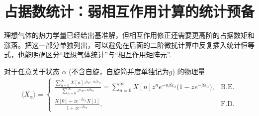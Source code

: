 \section{占据数统计：弱相互作用计算的统计预备}

理想气体的热力学量已经给出基准解，但相互作用修正还需要更高阶的占据数矩和涨落。把这一部分单独列出，可以避免在后面的二阶微扰计算中反复插入统计恒等式，也能明确区分“理想气体统计”与“相互作用矩阵元”.

对于任意关于状态 \(\alpha\) (不含自旋，自旋简并度单独记为\(g\)) 的物理量
\begin{align*}
	\langle X_{\alpha} \rangle =
	\begin{cases}
		\displaystyle \frac{ \sum_{n=0}^{\infty} X[n] z^{n} e^{-n \beta \varepsilon_{\alpha}}}{ \sum_{n=0}^{\infty} z^{n} e^{-n \beta \varepsilon_{\alpha}}} = \sum_{n=0}^{\infty} X[n] z^{n} e^{-n \beta \varepsilon_{\alpha}} \bigl( 1 - z e^{-\beta \varepsilon_{\alpha}} \bigr), & \text{B.E.} \\[12pt]
		\displaystyle \frac{X[0] + z e^{-\beta \varepsilon_{\alpha}} X[1]}{1 + z e^{-\beta \varepsilon_{\alpha}}},                                                                                                                                                                   & \text{F.D.}
	\end{cases}
\end{align*}

